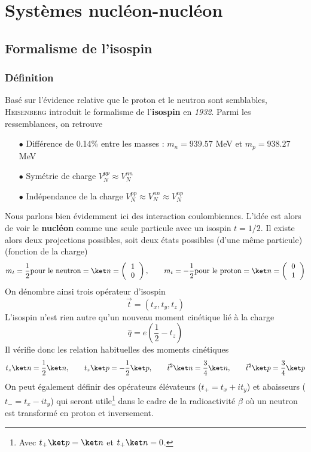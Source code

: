 \chapter{Systèmes nucléon-nucléon}
\section{Formalisme de l'isospin}
	\subsection{Définition}
	Basé sur l'évidence relative que le proton et le neutron sont semblables, \textsc{Heisenberg} 
	introduit le formalisme de l'\textbf{isospin} en \textit{1932}. Parmi les ressemblances, on retrouve
	\begin{itemize}
	\item[$\bullet$] Différence de 0.14\% entre les masses : $m_n = 939.57$ MeV et $m_p = 938.27$ MeV
	\item[$\bullet$] Symétrie de charge $V_N^{pp} \approx V_{N}^{nn}$
	\item[$\bullet$] Indépendance de la charge $V_N^{pp} \approx V_{N}^{nn} \approx V_{N}^{np}$
	\end{itemize}
	Nous parlons bien évidemment ici des interaction coulombiennes. L'idée est alors de voir le
	\textbf{nucléon} comme une seule particule avec un isospin $t=1/2$. Il existe alors deux 
	projections possibles, soit deux états possibles (d'une même particule)(fonction de la charge)
	\begin{equation}
	m_t = \frac{1}{2} \text{pour le neutron} = \ket n = \left(\begin{tabular}{c}
	1\\
	0
	\end{tabular}\right),\qquad 	m_t = -\frac{1}{2} \text{pour le proton} = \ket n = \left(\begin{tabular}{c}
	0\\
	1
	\end{tabular}\right)
	\end{equation}
	On dénombre ainsi trois opérateur d'isospin
	\begin{equation}
	\vec{t} = (t_x,t_y,t_z)
	\end{equation}
	L'isospin n'est rien autre qu'un nouveau moment cinétique lié à la charge
	\begin{equation}
	\hat{q} = e\left(\dfrac{1}{2}-t_z\right)
	\end{equation}
	Il vérifie donc les relation habituelles des moments cinétiques
	\begin{equation}
	t_z\ket n = \frac{1}{2}\ket n,\qquad t_z\ket p = -\frac{1}{2}\ket p,\qquad \vec{t}^2\ket n = \frac{3}{4}
	\ket n,\qquad \vec{t}^2\ket p = \frac{3}{4}\ket p
	\end{equation}
	On peut également définir des opérateurs élévateurs ($t_+ = t_x+it_y$) et abaisseurs ($t_- = t_x-it_y$)
	qui seront utile\footnote{Avec $t_+\ket p = \ket n$ et $t_+\ket n = 0$.} dans le cadre de la radioactivité
	 $\beta$ où un neutron est transformé en proton et inversement. \\
	 
